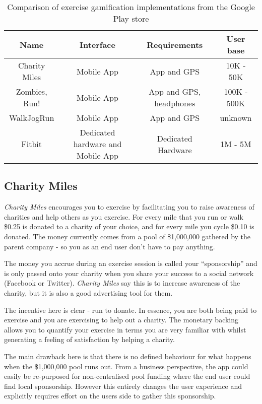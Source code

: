 \begin{table}[h]
  \centering
  \begin{tabular}{ | c | c | c | c |} \hline
    Name & Interface & Requirements & User base  \\ \hline
    Charity Miles & Mobile App & App and GPS & 10K - 50K\cite{charitymiles_store}\\ \hline
    Zombies, Run! & Mobile App & App and GPS, headphones & 100K - 500K\cite{zombiesrun_store}\\ \hline
    WalkJogRun & Mobile App & App and GPS  & unknown \\ \hline
    Fitbit & Dedicated hardware and Mobile App & Dedicated Hardware & 1M - 5M\cite{fitbit_store}\\ \hline
  \end{tabular}
  \caption{Comparison of exercise gamification implementations from
    the Google Play store}
  \label{table:competitor_comparison}
\end{table}

\subsection{Charity Miles}
\label{sec:charity_miles}
\emph{Charity Miles} encourages you to exercise by facilitating you to raise
awareness of charities and help
others as you exercise. For every mile that you run or walk \$0.25 is
donated to a charity of your choice, and for every mile you cycle \$0.10
is donated. The money currently comes from a pool of \$1,000,000
gathered by the parent company - so you as an end user don't have to pay
anything. 

The money you accrue during an exercise session is called your
``sponsorship'' and is only passed onto your charity when you share
your success to a social network (Facebook or
Twitter)\cite{charitymiles_terms}. \emph{Charity Miles} say this is to
increase awareness of the charity, but it is also a good advertising
tool for them.

The incentive here is clear - run to donate. In essence, you are both
being paid to exercise and you are exercising to help out a
charity. The monetary backing allows you to quantify your exercise in
terms you are very familiar with whilst generating a feeling of
satisfaction by helping a charity.

The main drawback here is that there is no defined behaviour for what
happens when the \$1,000,000 pool runs out. From a business
perspective, the app could easily be re-purposed for non-centralised
pool funding where the end user could find local sponsorship. However
this entirely changes the user experience and explicitly requires
effort on the users side to gather this sponsorship. 

